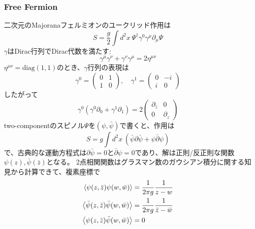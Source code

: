 \documentclass[11pt, aps, longbibliography]{article}
\numberwithin{equation}{section}
\begin{document}
    \subsubsection{Free Fermion}
        二次元のMajoranaフェルミオンのユークリッド作用は
        \begin{equation}\label{eq:FreeFermion1}
            S = \frac{g}{2}\int d^2x \ \Psi^\dagger \gamma^0 \gamma^\mu \partial_\mu \Psi
        \end{equation}
        $\gamma$はDirac行列でDirac代数を満たす:
        \begin{equation}\label{eq:FreeFermion2}
            \gamma^\mu \gamma^\nu + \gamma^\nu \gamma^\mu = 2\eta^{\mu\nu}
        \end{equation}
        $\eta^{\mu\nu} = \text{diag}(1,1)$のとき、$\gamma$行列の表現は
        \begin{equation}\label{eq:FreeFermion3}
                \gamma^0 = \begin{pmatrix}0 & 1 \\ 1 & 0\end{pmatrix}, \quad \gamma^1 =  \begin{pmatrix}0 & -i \\ i & 0\end{pmatrix}
        \end{equation}
        したがって
        \begin{equation}\label{eq:FreeFermion4}
            \gamma^0 (\gamma^0 \partial_0 + \gamma^1 \partial_1) = 2 \begin{pmatrix}\partial_{\bar{z}} & 0 \\ 0 & \partial_z \end{pmatrix}
        \end{equation}
        two-componentのスピノル$\Psi$を$(\psi, \bar{\psi})$で書くと、作用は
        \begin{equation}\label{eq:FreeFermion5}
            S = g\int d^2x \ \left( \bar{\psi}\partial \bar{\psi} + \psi \bar{\partial} \psi \right)
        \end{equation}
        で、古典的な運動方程式は$\partial \bar{\psi}=0$と$\bar{\partial}\psi = 0$であり、解は正則/反正則な関数$\psi(z),\bar{\psi}(\bar{z})$となる。
        2点相関関数はグラスマン数のガウシアン積分に関する知見から計算できて、複素座標で
        \begin{align}\label{eq:FreeFermion6}
            \expval{\psi(z, \bar{z})\psi(w, \bar{w})} &= \frac{1}{2\pi g}\frac{1}{z-w} \\
            \expval{\bar{\psi}(z, \bar{z})\bar{\psi}(w, \bar{w})} &= \frac{1}{2\pi g}\frac{1}{\bar{z}-\bar{w}} \\
            \expval{\psi(z, \bar{z})\bar{\psi}(w, \bar{w})} &= 0
        \end{align}
\end{document}
